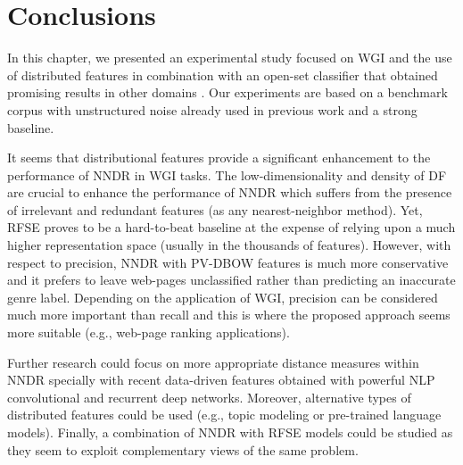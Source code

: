 \section{Conclusions}\label{chap:word_embeddings:sec:conclusions}

In this chapter, we presented an experimental study focused on WGI and the use of distributed features in combination with an open-set classifier that obtained promising results in other domains \parencite{mendesjunior2016}. Our experiments are based on a benchmark corpus with unstructured noise already used in previous work and a strong baseline. 

It seems that distributional features provide a significant enhancement to the performance of NNDR in WGI tasks. The low-dimensionality and density of DF are crucial to enhance the performance of NNDR which suffers from the presence of irrelevant and redundant features (as any nearest-neighbor method). Yet, RFSE proves to be a hard-to-beat baseline at the expense of relying upon a much higher representation space (usually in the thousands of features). However, with respect to precision, NNDR with PV-DBOW features is much more conservative and it prefers to leave web-pages unclassified rather than predicting an inaccurate genre label. Depending on the application of WGI, precision can be considered much more important than recall and this is where the proposed approach seems more suitable (e.g., web-page ranking applications).

Further research could focus on more appropriate distance measures within NNDR specially with recent data-driven features obtained with powerful NLP convolutional and recurrent deep networks. Moreover, alternative types of distributed features could be used (e.g., topic modeling or pre-trained language models). Finally, a combination of NNDR with RFSE models could be studied as they seem to exploit complementary views of the same problem.

